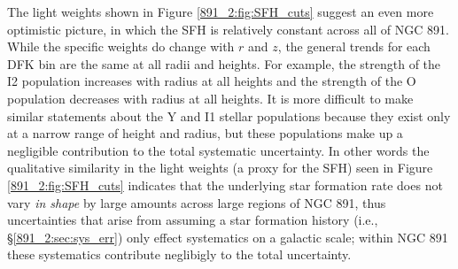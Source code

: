 




The light weights shown in Figure \ref{891_2:fig:SFH_cuts} suggest an even
more optimistic picture, in which the SFH is relatively constant
across all of NGC 891. While the specific weights do change with $r$
and $z$, the general trends for each DFK bin are the same at all radii
and heights. For example, the strength of the I2 population increases
with radius at all heights and the strength of the O population
decreases with radius at all heights. It is more difficult to make
similar statements about the Y and I1 stellar populations because they
exist only at a narrow range of height and radius, but these
populations make up a negligible contribution to the total systematic
uncertainty. In other words the qualitative similarity in the light
weights (a proxy for the SFH) seen in Figure \ref{891_2:fig:SFH_cuts}
indicates that the underlying star formation rate does not vary
\emph{in shape} by large amounts across large regions of NGC 891, thus
uncertainties that arise from assuming a star formation history (i.e.,
\S\ref{891_2:sec:sys_err}) only effect systematics on a galactic scale;
within NGC 891 these systematics contribute neglibigly to the total
uncertainty.

